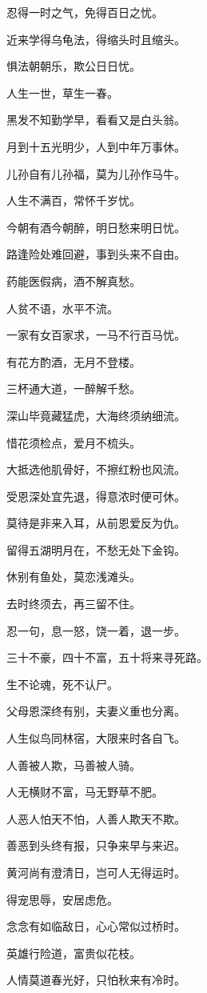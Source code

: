 \documentclass[12pt,oneside]{book}
\begin{document}
忍得一时之气，免得百日之忧。

近来学得乌龟法，得缩头时且缩头。

惧法朝朝乐，欺公日日忧。

人生一世，草生一春。

黑发不知勤学早，看看又是白头翁。

月到十五光明少，人到中年万事休。

儿孙自有儿孙福，莫为儿孙作马牛。

人生不满百，常怀千岁忧。

今朝有酒今朝醉，明日愁来明日忧。

路逢险处难回避，事到头来不自由。

药能医假病，酒不解真愁。

人贫不语，水平不流。

一家有女百家求，一马不行百马忧。

有花方酌酒，无月不登楼。

三杯通大道，一醉解千愁。

深山毕竟藏猛虎，大海终须纳细流。

惜花须检点，爱月不梳头。

大抵选他肌骨好，不擦红粉也风流。

受恩深处宜先退，得意浓时便可休。

莫待是非来入耳，从前恩爱反为仇。

留得五湖明月在，不愁无处下金钩。

休别有鱼处，莫恋浅滩头。

去时终须去，再三留不住。

忍一句，息一怒，饶一着，退一步。

三十不豪，四十不富，五十将来寻死路。

生不论魂，死不认尸。

父母恩深终有别，夫妻义重也分离。

人生似鸟同林宿，大限来时各自飞。

人善被人欺，马善被人骑。

人无横财不富，马无野草不肥。

人恶人怕天不怕，人善人欺天不欺。

善恶到头终有报，只争来早与来迟。

黄河尚有澄清日，岂可人无得运时。

得宠思辱，安居虑危。

念念有如临敌日，心心常似过桥时。

英雄行险道，富贵似花枝。

人情莫道春光好，只怕秋来有冷时。
\end{document}
